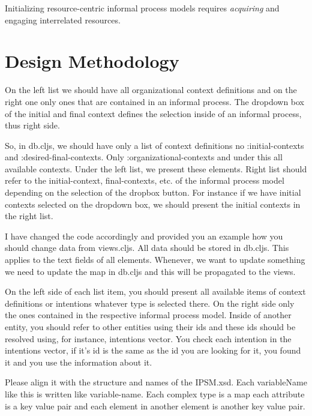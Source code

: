   


Initializing resource-centric informal process models requires \textit{acquiring} and engaging interrelated resources.

\section{Design Methodology}
\label{sec:designmethodology}

On the left list we should have all organizational context definitions and on the right one only ones that are contained in an informal process. The dropdown box of the initial and final context defines the selection inside of an informal process, thus right side.

So, in db.cljs, we should have only a list of context definitions no :initial-contexts and :desired-final-contexts. Only :organizational-contexts and under this all available contexts. Under the left list, we present these elements. Right list should refer to the initial-context, final-contexts, etc. of the informal process model depending on the selection of the dropbox button. For instance if we have initial contexts selected on the dropdown box, we should present the initial contexts in the right list.

I have changed the code accordingly and provided you an example how you should change data from views.cljs. All data should be stored in db.cljs. This applies to the text fields of all elements. Whenever, we want to update something we need to update the map in db.cljs and this will be propagated to the views.


On the left side of each list item, you should present all available items of context definitions or intentions whatever type is selected there. On the right side only the ones contained in the respective informal process model. Inside of another entity, you should refer to other entities using their ids and these ids should be resolved using, for instance, intentions vector. You check each intention in the intentions vector, if it’s id is the same as the id you are looking for it, you found it and you use the information about it.  


Please align it with the structure and names of the IPSM.xsd. Each variableName like this is written like variable-name. Each complex type is a map each attribute is a key value pair and each element in another element is another key value pair.


